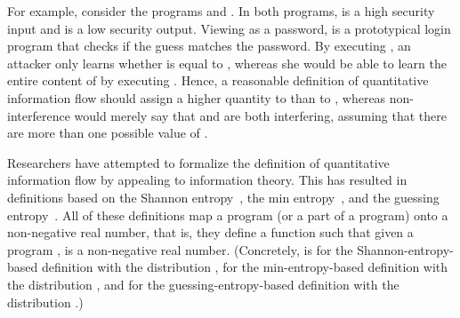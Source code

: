 \documentclass[]{eptcs}
\begin{document}
For example, consider the programs  and .  In both programs,  is a high security input and
 is a low security output.  Viewing  as a password,  is a
prototypical login program that checks if the guess  matches the
password.  By executing , an attacker only learns whether  is
equal to , whereas she would be able to learn the entire content of
 by executing .  Hence, a reasonable definition of
quantitative information flow should assign a higher quantity to 
than to , whereas non-interference would merely say that 
and  are both interfering, assuming that there are more than one
possible value of .

Researchers have attempted to formalize the definition of quantitative
information flow by appealing to information theory.  This has
resulted in definitions based on the Shannon
entropy~\cite{denning82,clarkjcs2007,malacaria:popl2007}, the min
entropy~\cite{smith09}, and the guessing
entropy~\cite{kopf07,DBLP:conf/sp/BackesKR09}.  All of these
definitions map a program (or a part of a program) onto a non-negative
real number, that is, they define a function  such that
given a program ,  is a non-negative real number.
(Concretely,  is  for the
Shannon-entropy-based definition with the distribution ,  for the min-entropy-based definition with the distribution
, and  for the guessing-entropy-based definition
with the distribution .)
\end{document}
